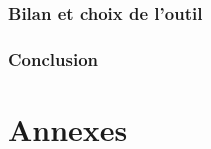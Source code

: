 \documentclass[paper=a4,12pt]{article}
\numberwithin{equation}{section}		%
\numberwithin{figure}{section}			%
\numberwithin{table}{section}				%
\begin{document}
\section{Bilan et choix de l'outil}


\section{Conclusion}


  \newpage

%  
%  
%
  \appendix
  \part*{Annexes}
  
  

  
  

 


\end{document}
